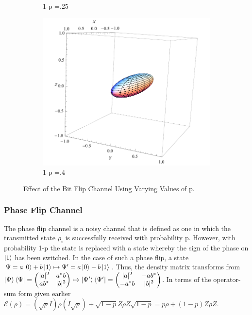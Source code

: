 \documentclass[letterpaper,twoside,10pt]{article}
\begin{document}
\begin{figure}[H]
\begin{subfigure}{.3\textwidth}
		\caption{1-p =.25}%
	\end{subfigure}
	\begin{subfigure}{.3\textwidth}
		\includegraphics[width=\columnwidth,natwidth=300,natheight=300]{./BitFlip/BitFlipPoint4.pdf}%
		\caption{1-p =.4}%
	\end{subfigure}
	\caption{Effect of the Bit Flip Channel Using Varying Values of p.}
\end{figure}
	
\subsubsection{Phase Flip Channel}

The phase flip channel is a noisy channel that is defined as one in which the transmitted state $\rho_i$ is successfully received with probability p. However, with probability 1-p the state is replaced with a state whereby the sign of the phase on $\ket{1}$ has been switched. In the case of such a phase flip, a state $\Psi = a\ket{0}+b\ket{1} \mapsto \Psi'=a\ket{0}-b\ket{1}$. Thus, the density matrix transforms from $\ket{\Psi}\bra{\Psi}= \begin{pmatrix} |a|^2 & a^*b \\ ab^* & |b|^2 \end{pmatrix} \mapsto \ket{\Psi'}\bra{\Psi'}=\begin{pmatrix} |a|^2 & -ab^* \\ -a^*b & |b|^2 \end{pmatrix}$. In terms of the operator-sum form given earlier $\mathcal{E}(\rho) = (\sqrt p I)\rho (I\sqrt p)+\sqrt{1-p}Z\rho Z\sqrt{1-p} = p\rho + (1-p)Z\rho Z$. 
\end{document}

